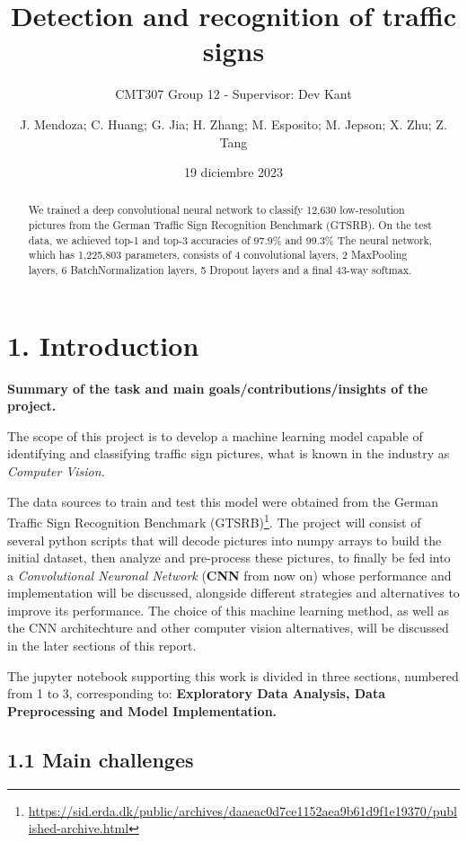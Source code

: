 \documentclass[
  11pt,
]{article}
\title{Detection and recognition of traffic signs}
\subtitle{CMT307 Group 12 - Supervisor: Dev Kant}
\author{J. Mendoza; C. Huang; G. Jia; H. Zhang; M. Esposito; M. Jepson;
X. Zhu; Z. Tang}
\date{19 diciembre 2023}
\begin{document}
\maketitle
\begin{abstract}
We trained a deep convolutional neural network to classify 12,630
low-resolution pictures from the German Traffic Sign Recognition
Benchmark (GTSRB). On the test data, we achieved top-1 and top-3
accuracies of 97.9\% and 99.3\% The neural network, which has 1,225,803
parameters, consists of 4 convolutional layers, 2 MaxPooling layers, 6
BatchNormalization layers, 5 Dropout layers and a final 43-way softmax.
\end{abstract}

{
\setcounter{tocdepth}{2}
\tableofcontents
}
\pagebreak

\hypertarget{intro}{%
\section{1. Introduction}\label{intro}}

\textbf{Summary of the task and main goals/contributions/insights of the
project.}

The scope of this project is to develop a machine learning model capable
of identifying and classifying traffic sign pictures, what is known in
the industry as \emph{Computer Vision.}

The data sources to train and test this model were obtained from the
German Traffic Sign Recognition Benchmark (GTSRB)\footnote{\url{https://sid.erda.dk/public/archives/daaeac0d7ce1152aea9b61d9f1e19370/published-archive.html}}.
The project will consist of several python scripts that will decode
pictures into numpy arrays to build the initial dataset, then analyze
and pre-process these pictures, to finally be fed into a
\emph{Convolutional Neuronal Network} (\textbf{CNN} from now on) whose
performance and implementation will be discussed, alongside different
strategies and alternatives to improve its performance. The choice of
this machine learning method, as well as the CNN architechture and other
computer vision alternatives, will be discussed in the later sections of
this report.

The jupyter notebook supporting this work is divided in three sections,
numbered from 1 to 3, corresponding to: \textbf{Exploratory Data
Analysis, Data Preprocessing and Model Implementation.}

\hypertarget{main-challenges}{%
\subsection{1.1 Main challenges}\label{main-challenges}}
\end{document}

